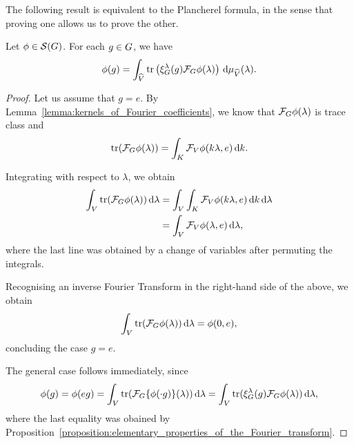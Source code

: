 The following result is equivalent to the Plancherel formula,
in the sense that proving one allows us to prove the other.

\begin{proposition}
\label{proposition:inverse_Fourier_Transform}
    Let $\phi \in \Schwartz{\Group}$.
    For each $g \in \Group$,
    we have
    \begin{align*}
        \phi(g)
        = \int_\dualGroup{\VectorSpace}
        \tr \left( \Rep{\lambda}(g) \Fourier \phi(\lambda) \right) \dd \Plancherel{\VectorSpace}(\lambda).
    \end{align*}
\end{proposition}
\begin{proof}
    Let us assume that $g = e$.
    By Lemma~\ref{lemma:kernels_of_Fourier_coefficients}, we know that $\Fourier \phi(\lambda)$ is trace class and
    \begin{align*}
        \tr(\Fourier \phi(\lambda))
        = \int_\CompactGroup \Fourier[\VectorSpace] \phi(k \lambda, e) \dd k.
    \end{align*}

    Integrating with respect to $\lambda$, we obtain
    \begin{align*}
        \int_\VectorSpace \tr(\Fourier \phi(\lambda)) \dd \lambda
        &= \int_\VectorSpace \int_\CompactGroup \Fourier[\VectorSpace] \phi(k \lambda, e) \dd k \dd \lambda\\
        &= \int_\VectorSpace \Fourier[\VectorSpace] \phi(\lambda, e) \dd \lambda,
    \end{align*}
    where the last line was obtained by a change of variables after permuting the integrals.

    Recognising an inverse Fourier Transform in the right-hand side of the above, we obtain
    \begin{align*}
        \int_\VectorSpace \tr(\Fourier \phi(\lambda)) \dd \lambda
        = \phi(0, e),
    \end{align*}
    concluding the case $g = e$.

    The general case follows immediately, since
    \begin{align*}
        \phi(g) = \phi(e g) = \int_\VectorSpace \tr(\Fourier \{\phi(\dummy g)\}(\lambda)) \dd \lambda
        = \int_\VectorSpace \tr(\Rep\lambda(g) \Fourier \phi(\lambda)) \dd \lambda,
    \end{align*}
    where the last equality was obained by Proposition~\ref{proposition:elementary_properties_of_the_Fourier_transform}.
\end{proof}

